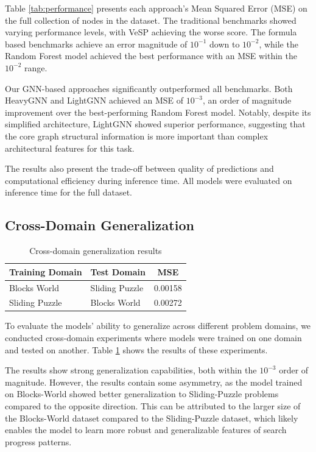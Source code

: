 \documentclass[letterpaper]{article}
\newcommand{\naomi}[1]{{\color{magenta}{Naomi: #1}}}
\begin{document}
Table \ref{tab:performance} presents each approach's Mean Squared Error (MSE) on the full collection of nodes in the dataset. The traditional benchmarks showed varying performance levels, with VeSP achieving the worse score. The formula based benchmarks achieve an error magnitude of $10^{-1}$ down to $10^{-2}$, while the Random Forest model achieved the best performance with an MSE within the $10^{-2}$ range.

Our GNN-based approaches significantly outperformed all benchmarks. Both HeavyGNN and LightGNN achieved an MSE of $10^{-3}$, an order of magnitude improvement over the best-performing Random Forest model. Notably, despite its simplified architecture, LightGNN showed superior performance, suggesting that the core graph structural information is more important than complex architectural features for this task.

The results also present the trade-off between quality of predictions and computational efficiency during inference time. All models were evaluated on inference time for the full dataset. \naomi{expand...}


\subsection{Cross-Domain Generalization}

\begin{table}
    \centering
    \caption{Cross-domain generalization results}
    \label{tab:cross_domain}
    \begin{tabular}{|l|l|c|}
    \hline
    \textbf{Training Domain} & \textbf{Test Domain} & \textbf{MSE} \\
    \hline
    Blocks World & Sliding Puzzle & 0.00158 \\
    Sliding Puzzle & Blocks World & 0.00272 \\
    \hline
    \end{tabular}
\end{table}

To evaluate the models' ability to generalize across different problem domains, we conducted cross-domain experiments where models were trained on one domain and tested on another. Table \ref{tab:cross_domain} shows the results of these experiments.

The results show strong generalization capabilities, both within the $10^{-3}$ order of magnitude.
However, the results contain some asymmetry, as the model trained on Blocks-World showed better generalization to Sliding-Puzzle problems compared to the opposite direction. This can be attributed to the larger size of the Blocks-World dataset compared to the Sliding-Puzzle dataset, which likely enables the model to learn more robust and generalizable features of search progress patterns.
\end{document}
